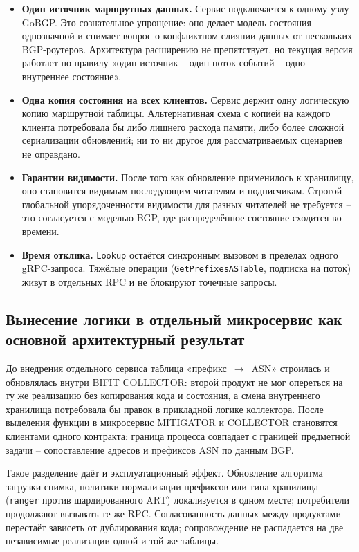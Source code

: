 \begin{itemize}
\item \textbf{Один источник маршрутных данных.} Сервис подключается к
одному узлу GoBGP. Это сознательное упрощение: оно делает модель
состояния однозначной и снимает вопрос о конфликтном слиянии данных
от нескольких BGP-роутеров. Архитектура расширению не препятствует,
но текущая версия работает по правилу «один источник -- один поток
событий -- одно внутреннее состояние».
\item \textbf{Одна копия состояния на всех клиентов.} Сервис держит
одну логическую копию маршрутной таблицы. Альтернативная схема
с копией на каждого клиента потребовала бы либо лишнего расхода
памяти, либо более сложной сериализации обновлений; ни то ни другое
для рассматриваемых сценариев не оправдано.
\item \textbf{Гарантии видимости.} После того как обновление
применилось к хранилищу, оно становится видимым последующим
читателям и подписчикам. Строгой глобальной упорядоченности видимости
для разных читателей не требуется -- это согласуется с моделью BGP,
где распределённое состояние сходится во времени.
\item \textbf{Время отклика.} \texttt{Lookup} остаётся синхронным
вызовом в пределах одного gRPC-запроса. Тяжёлые операции
(\texttt{GetPrefixesASTable}, подписка на поток) живут в отдельных
RPC и не блокируют точечные запросы.
\end{itemize}

\subsection{Вынесение логики в отдельный микросервис как основной архитектурный результат}

До внедрения отдельного сервиса таблица «префикс~$\rightarrow$~ASN»
строилась и обновлялась внутри BIFIT COLLECTOR: второй продукт не мог
опереться на ту же реализацию без копирования кода и состояния, а
смена внутреннего хранилища потребовала бы правок в прикладной логике
коллектора.
После выделения функции в микросервис MITIGATOR и COLLECTOR становятся
клиентами одного контракта: граница процесса совпадает с границей
предметной задачи -- сопоставление адресов и префиксов ASN по данным
BGP.

Такое разделение даёт и эксплуатационный эффект. Обновление алгоритма
загрузки снимка, политики нормализации префиксов или типа хранилища
(\texttt{ranger} против шардированного ART) локализуется в одном месте;
потребители продолжают вызывать те же RPC. Согласованность данных между
продуктами перестаёт зависеть от дублирования кода; сопровождение не
распадается на две независимые реализации одной и той же таблицы.

